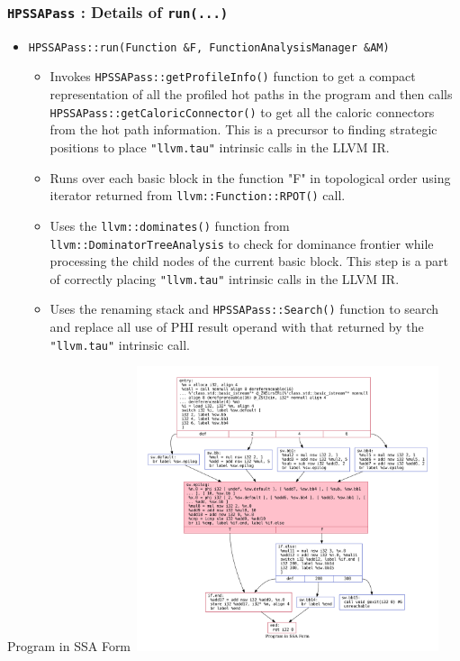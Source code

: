 \documentclass[aspectratio=169, compress]{beamer}
\begin{document}
\begin{frame}
	\frametitle{\texttt{HPSSAPass} : Details of \texttt{run(...)}}
	\begin{itemize}
		\item \texttt{HPSSAPass::run(Function &F, FunctionAnalysisManager &AM)} 
		\begin{itemize}
			\footnotesize
			\item Invokes \texttt{HPSSAPass::getProfileInfo()} function to get a compact representation of all the profiled \color{red} hot paths \color{black} in the program and then calls \texttt{HPSSAPass::getCaloricConnector()} to get all the caloric connectors from the \color{red} hot path \color{black} information. This is a precursor to finding strategic positions to place \texttt{"llvm.tau"} intrinsic calls in the LLVM IR. \pause
			\item Runs over each basic block in the function "F" in topological order using iterator returned from \texttt{llvm::Function::RPOT()} call.
			\item Uses the \texttt{llvm::dominates()} function from \texttt{llvm::DominatorTreeAnalysis} to check for dominance frontier while processing the child nodes of the current basic block. This step is a part of correctly placing \texttt{"llvm.tau"} intrinsic calls in the LLVM IR. \pause
			\item Uses the renaming stack and \texttt{HPSSAPass::Search()} function to search and replace all use of PHI result operand with that returned by the \texttt{"llvm.tau"} intrinsic call.
		\end{itemize}
	\end{itemize}
\end{frame}

\begin{frame}{Program in SSA Form}
	\centering
	\includegraphics[width=9cm, height=8.35cm]{dotfiles/baseline.dot.pdf}
\end{frame}
\end{document}
